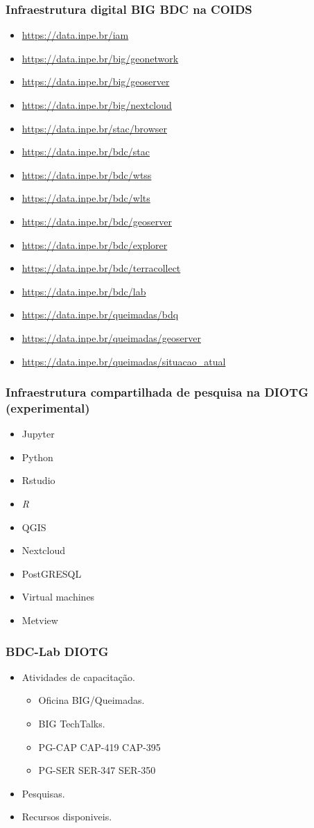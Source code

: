 \begin{frame}
	\frametitle{Infraestrutura digital BIG BDC na COIDS}
	\begin{itemize}
		\item \url{https://data.inpe.br/iam}
		\item \url{https://data.inpe.br/big/geonetwork}
		\item \url{https://data.inpe.br/big/geoserver}
		\item \url{https://data.inpe.br/big/nextcloud}
		\item \url{https://data.inpe.br/stac/browser}
		\item \url{https://data.inpe.br/bdc/stac}
		\item \url{https://data.inpe.br/bdc/wtss}
		\item \url{https://data.inpe.br/bdc/wlts}
		\item \url{https://data.inpe.br/bdc/geoserver}
		\item \url{https://data.inpe.br/bdc/explorer}
		\item \url{https://data.inpe.br/bdc/terracollect}
		\item \url{https://data.inpe.br/bdc/lab}
		\item \url{https://data.inpe.br/queimadas/bdq}
		\item \url{https://data.inpe.br/queimadas/geoserver}
		\item \url{https://data.inpe.br/queimadas/situacao_atual}
	\end{itemize}
\end{frame}

\begin{frame}
	\frametitle{Infraestrutura compartilhada de pesquisa na DIOTG (experimental)}
	\begin{itemize}
		\item Jupyter
		\item Python
		\item Rstudio
		\item \textit{R}
		\item QGIS
		\item Nextcloud
		\item PostGRESQL
		\item Virtual machines
		\item Metview
	\end{itemize}
\end{frame}

\begin{frame}
	\frametitle{BDC-Lab DIOTG}
	\begin{itemize}
		\item Atividades de capacitação.
		      \begin{itemize}
			      \item Oficina BIG/Queimadas.
			      \item BIG TechTalks.
			      \item PG-CAP CAP-419 CAP-395
			      \item PG-SER SER-347 SER-350
		      \end{itemize}
		\item Pesquisas.
		\item Recursos disponiveis.
	\end{itemize}
\end{frame}
